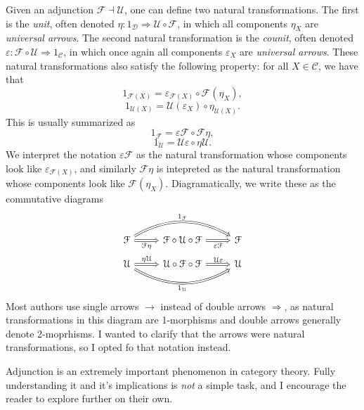 Given an adjunction $\mathcal{F} \dashv \mathcal{U} $, one can define two natural transformations. The first is the \emph{unit}, often denoted $\eta : 1_{\mathcal{D} }  \Rightarrow \mathcal{U} \circ \mathcal{F} $, in which all components $\eta_X$ are \emph{universal arrows}. The second natural transformation is the \emph{counit}, often denoted $\varepsilon : \mathcal{F} \circ \mathcal{U}  \Rightarrow 1_{\mathcal{C} } $, in which once again all components $\varepsilon_X$ are \emph{universal arrows}. These natural transformations also satisfy the following property: for all $X\in \mathcal{C} $, we have that
\[
	1_{\mathcal{F}(X)} =\varepsilon_{\mathcal{F} (X)} \circ \mathcal{F} (\eta_{X} ),
\]
\[
	1_{\mathcal{U} (X)} =\mathcal{U} (\varepsilon_{X} )\circ \eta_{\mathcal{U} (X)} 
.\]
This is usually summarized as
\[
	1_{\mathcal{F} } =\varepsilon \mathcal{F} \circ \mathcal{F} \eta ,
\]
\[
	1_{\mathcal{U} } =\mathcal{U} \varepsilon \circ \eta \mathcal{U} 
.\]
We interpret the notation $\varepsilon \mathcal{F} $ as the natural transformation whose components look like $\varepsilon_{\mathcal{F} (X)} $, and similarly $\mathcal{F} \eta $ is intepreted as the natural transformation whose components look like $\mathcal{F} (\eta _X)$. Diagramatically, we write these as the commutative diagrams
\[\begin{tikzcd}[row sep = 1em, column sep = 2.5em]
\mathcal{F} \ar[" \mathcal{F} \eta  "', Rightarrow, r]\ar[" 1_{\mathcal{F} }  ", Rightarrow, bend left, rr]   & \mathcal{F} \circ \mathcal{U} \circ \mathcal{F} \ar[" \varepsilon \mathcal{F}  "', Rightarrow, r]  & \mathcal{F}  \\
\mathcal{U} \ar[" 1_{\mathcal{U} }  "', Rightarrow, bend right, rr] \ar[" \eta \mathcal{U}  ", Rightarrow, r]  & \mathcal{U} \circ \mathcal{F} \circ \mathcal{F} \ar[" \mathcal{U} \varepsilon  ", Rightarrow, r]  & \mathcal{U} 
\end{tikzcd}\]
Most authors use single arrows $\to $ instead of double arrows $\Rightarrow$, as natural transformations in this diagram are 1-morphisms and double arrows generally denote 2-moprhisms. I wanted to clarify that the arrows were natural transformations, so I opted fo that notation instead.

Adjunction is an extremely important phenomenon in category theory. Fully understanding it and it's implications is \emph{not} a simple task, and I encourage the reader to explore further on their own.
